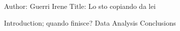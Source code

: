 Author: Guerri Irene 
Title: Lo sto copiando da lei


Introduction; quando finisce?
Data
Analysis
Conclusions
